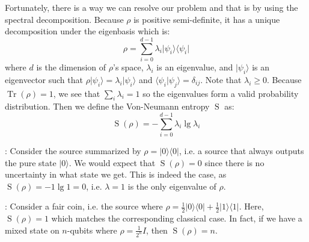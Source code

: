 \documentclass[11pt]{article}
\newcommand{\tr}{\operatorname{Tr}}
\newcommand{\vne}{\operatorname{S}}
\newcommand{\bra}[1]{\langle #1 \rvert}
\newcommand{\ket}[1]{\lvert #1 \rangle}
\newcommand{\bret}[2]{\langle{#1}|{#2}\rangle}
\newcommand{\kret}[2]{\ket{#1}\bra{#2}}
\newcommand{\kera}[1]{\kret{#1}{#1}}
\newcommand{\Example}[1]{{\bf Example #1}:}
\def\fill{   \hfill}
\begin{document}
\noindent Fortunately, there is a way we can resolve our problem and that is by using the spectral decomposition. Because $\rho$ is positive semi-definite, it has a unique decomposition under the eigenbasis which is:
\begin{equation*}
\rho = \sum_{i = 0}^{d-1} \lambda_i \kera{\psi_i}
\end{equation*}
where $d$ is the dimension of $\rho$'s space, $\lambda_i$ is an eigenvalue, and $\ket{\psi_i}$ is an eigenvector such that $\rho\ket{\psi_i} = \lambda_i \ket{\psi_i}$ and $\bret{\psi_i}{\psi_j} = \delta_{ij}$. Note that $\lambda_i \geq 0$. Because $\tr(\rho) = 1$, we see that $\sum_{i} \lambda_i = 1$ so the eigenvalues form a valid probability distribution. Then we define the Von-Neumann entropy $\vne$ as:
\begin{equation} \label{eq:def-vne}
\vne(\rho) = -\sum_{i = 0}^{d-1} \lambda_i \lg{\lambda_i}
\end{equation}

\fill

\noindent \Example{7} Consider the source summarized by $\rho = \kera{0}$, i.e. a source that always outputs the pure state $\ket{0}$. We would expect that $\vne(\rho) = 0$ since there is no uncertainty in what state we get. This is indeed the case, as $\vne(\rho) = -1\lg{1} = 0$, i.e. $\lambda = 1$ is the only eigenvalue of $\rho$.

\fill

\noindent \Example{8} Consider a fair coin, i.e. the source where $\rho = \frac{1}{2}\kera{0} + \frac{1}{2}\kera{1}$. Here, $\vne(\rho) = 1$ which matches the corresponding classical case. In fact, if we have a mixed state on $n$-qubits where $\rho = \frac{1}{2^n}I$, then $\vne(\rho) = n$.
\end{document}
